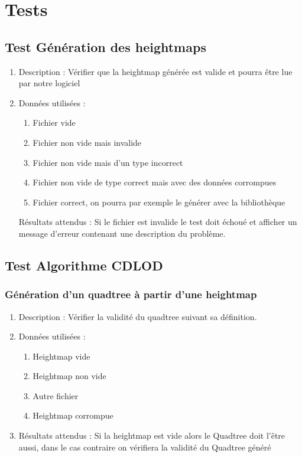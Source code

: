\documentclass[12pt]{report}
\begin{document}
\newpage

\chapter{Tests}

\section{Test Génération des heightmaps}
\begin{enumerate}
    \item Description : Vérifier que la heightmap générée est valide et pourra être lue par notre logiciel
    \item Données utilisées : 
    \begin{enumerate}
        \item Fichier vide
        \item Fichier non vide mais invalide
        \item Fichier non vide mais d'un type incorrect
        \item Fichier non vide de type correct mais avec des données corrompues
        \item Fichier correct, on pourra par exemple le générer avec la bibliothèque \cite{libnoisewebsite}
    \end{enumerate}
    
    Résultats attendus : Si le fichier est invalide le test doit échoué et afficher un message d'erreur contenant une description du problème.
\end{enumerate}

\section{Test Algorithme CDLOD}
\subsection{Génération d'un quadtree à partir d'une heightmap}
\begin{enumerate}
    \item Description : Vérifier la validité du quadtree suivant sa définition.
    \item Données utilisées :
    \begin{enumerate}
        \item Heightmap vide
        \item Heightmap non vide
        \item Autre fichier
        \item Heightmap corrompue
    \end{enumerate}
    \item Résultats attendus : Si la heightmap est vide alors le Quadtree doit l'être aussi, dans le cas contraire on vérifiera la validité du Quadtree généré
\end{enumerate}
\end{document}
